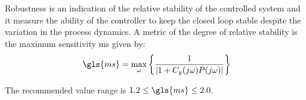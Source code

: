 \begin{refsection}
%
%


Robustness is an indication of the relative stability of the controlled system and it measure the ability of the controller to keep the closed loop stable despite the variation in the process dynamics. A metric of the degree of relative stability is the maximum sensitivity \gls{ms} given by:
%
\begin{equation}  %
\gls{ms}=  \max_\omega \left\{ \frac{1}{\left |{1 + C_y(j\omega ) P(j\omega )}\right |}\right\} 
\label{Ms}
\end{equation}

The recommended value range is  $1.2\leq \gls{ms} \leq 2.0$.
%

\end{refsection}
